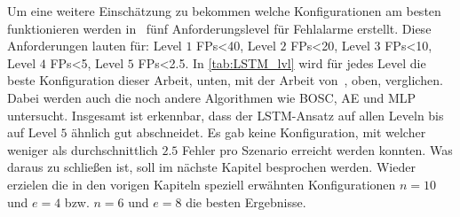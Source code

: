     Um eine weitere Einschätzung zu bekommen welche Konfigurationen am besten funktionieren werden in~\cite{IDSTHREADGRIMMER2021} fünf Anforderungslevel für Fehlalarme erstellt.
    Diese Anforderungen lauten für: Level $1$ \acp{FP}<40, Level $2$ \acp{FP}<20, Level $3$ \acp{FP}<10, Level $4$ \acp{FP}<5, Level $5$ \acp{FP}<2.5.
    In \autoref{tab:LSTM_lvl} wird für jedes Level die beste Konfiguration dieser Arbeit, unten, mit der Arbeit von~\cite{IDSTHREADGRIMMER2021}, oben, verglichen.
    Dabei werden auch die noch andere Algorithmen wie \ac{BOSC}, \ac{AE} und \ac{MLP} untersucht.
    Insgesamt ist erkennbar, dass der \ac{LSTM}-Ansatz auf allen Leveln bis auf Level $5$ ähnlich gut abschneidet.
    Es gab keine Konfiguration, mit welcher weniger als durchschnittlich $2.5$ Fehler pro Szenario erreicht werden konnten.
    Was daraus zu schließen ist, soll im nächste Kapitel besprochen werden.
    Wieder erzielen die in den vorigen Kapiteln speziell erwähnten Konfigurationen $n=10$ und $e=4$ bzw. $n=6$ und $e=8$ die besten Ergebnisse.

